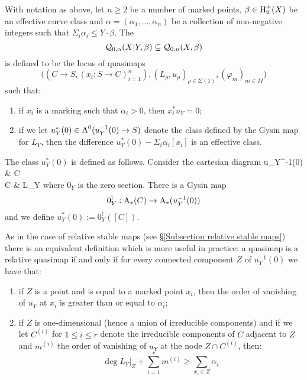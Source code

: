 \begin{definition} With notation as above, let $n \geq 2$ be a number of marked points, $\beta \in \operatorname{H}_2^+(X)$ be an effective curve class and $\alpha=(\alpha_1, \ldots, \alpha_n)$ be a collection of non-negative integers such that $\Sigma_i \alpha_i \leq Y \cdot \beta$. The 
\begin{equation*} \mathcal{Q}_{0,\alpha}(X|Y,\beta) \subseteq \mathcal{Q}_{0,n}(X,\beta) \end{equation*}
is defined to be the locus of quasimaps
\begin{equation*} \big((C \to S, (x_i : S \to C)_{i=1}^n), (L_\rho,u_\rho)_{\rho \in \Sigma(1)}, (\varphi_m)_{m \in M}\big) \end{equation*}
such that:
\begin{enumerate}
\item if $x_i$ is a marking such that $\alpha_i > 0$, then $x_i^* u_Y = 0$;
\item if we let $u_Y^*(0) \in \operatorname{A}^0(u_Y^{-1}(0)\rightarrow S)$ denote the class defined by the Gysin map for $L_Y$, then the difference $u_Y^*(0) - \Sigma_i \alpha_i [x_i]$ is an effective class.
\end{enumerate}
\end{definition}

\noindent The class $u_Y^*(0)$ is defined as follows. Consider the cartesian diagram
\bcd
u_Y^{-1}(0) \ar[r] \ar[d]  & C \ar[d,"u_Y"] \\
C \ar[r,"0_Y"] & L_Y
\ecd
where $0_Y$ is the zero section. There is a Gysin map \cite[\S 2.6]{FUL}
\begin{equation*} 0_Y^! : \operatorname{A}_*(C) \rightarrow \operatorname{A}_*(u_Y^{-1}(0)) \end{equation*}
and we define $u_Y^*(0) := 0_Y^!([C])$.


\begin{remark} As in the case of relative stable maps (see \S \ref{Subsection relative stable maps}) there is an equivalent definition which is more useful in practice: a quasimap is a relative quasimap if and only if for every connected component $Z$ of $u_Y^{-1}(0)$ we have that:
\begin{enumerate}
\item if $Z$ is a point and is equal to a marked point $x_i$, then the order of vanishing of $u_Y$ at $x_i$ is greater than or equal to $\alpha_i$;
\item if $Z$ is one-dimensional (hence a union of irreducible components) and if we let $C^{(i)}$ for $1 \leq i \leq r$ denote the irreducible components of $C$ adjacent to $Z$ and $m^{(i)}$ the order of vanishing of $u_Y$ at the node $Z \cap C^{(i)}$, then:
\begin{equation} \label{Relative quasimap internal component inequality} \deg L_Y|_Z + \sum_{i=1}^r m^{(i)} \geq \sum_{x_i \in Z} \alpha_i \tag{\textasteriskcentered\textasteriskcentered} \end{equation}
\end{enumerate}
\end{remark}

